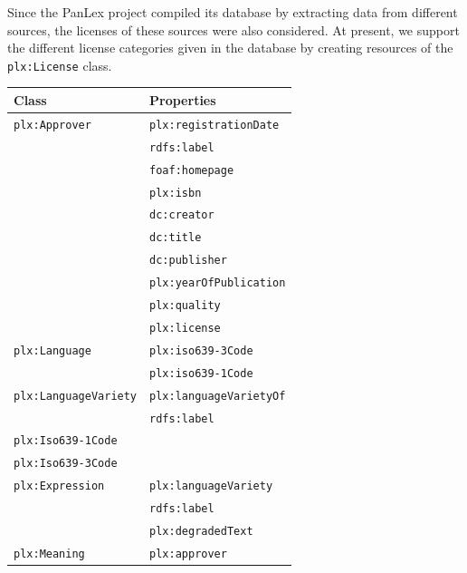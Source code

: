 \documentclass[sw]{iosart2c}
\begin{document}
Since the PanLex project compiled its database by extracting data from different sources, the licenses of these sources were also considered.
At present, we support the different license categories given in the database by creating resources of the \texttt{plx:License} class.
\begin{table}
\begin{scriptsize}
\begin{tabular}{ll}
Class & Properties \\
\toprule
\texttt{plx:Approver} & \texttt{plx:registrationDate} \\
                      & \texttt{rdfs:label} \\
                      & \texttt{foaf:homepage} \\
                      & \texttt{plx:isbn} \\
                      & \texttt{dc:creator} \\
                      & \texttt{dc:title} \\
                      & \texttt{dc:publisher} \\
                      & \texttt{plx:yearOfPublication} \\
                      & \texttt{plx:quality} \\
                      & \texttt{plx:license} \\
\midrule
\texttt{plx:Language}
                      & \texttt{plx:iso639-3Code} \\
                      & \texttt{plx:iso639-1Code} \\
\midrule
\texttt{plx:LanguageVariety}
                      & \texttt{plx:languageVarietyOf} \\
                      & \texttt{rdfs:label} \\
\midrule
\texttt{plx:Iso639-1Code} & \\
\midrule
\texttt{plx:Iso639-3Code} & \\
\midrule
\texttt{plx:Expression}
                      & \texttt{plx:languageVariety} \\
                      & \texttt{rdfs:label} \\
                      & \texttt{plx:degradedText} \\
\midrule
\texttt{plx:Meaning}
                      & \texttt{plx:approver} \\

\end{tabular}
\end{scriptsize}
\end{table}
\end{document}
